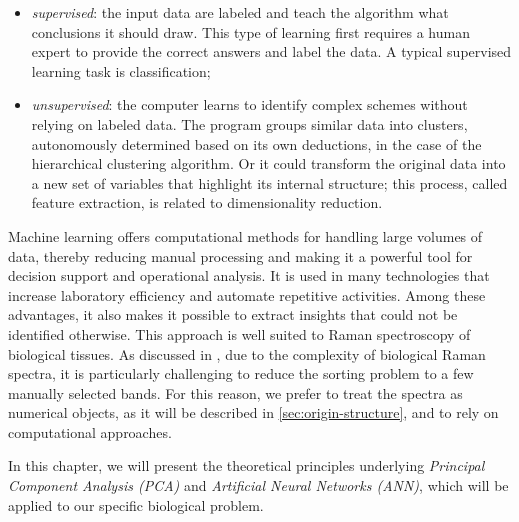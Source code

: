 \begin{itemize}
    \item \textit{supervised}: the input data are labeled and teach the algorithm what conclusions it should draw. This type of learning first requires a human expert to provide the correct answers and label the data. 
A typical supervised learning task is classification;    

       \item \textit{unsupervised}: the computer learns to identify complex schemes without relying on labeled data. The program groups similar data into clusters, autonomously determined based on its own deductions, in the case of the hierarchical clustering algorithm. Or it could transform the original data into a new set of variables that highlight its internal structure; this process, called feature extraction, is related to dimensionality reduction.
       
\end{itemize}


Machine learning offers computational methods for handling large volumes of data, thereby reducing manual processing and making it a powerful tool for decision support and operational analysis. It is used in many technologies that increase laboratory efficiency and automate repetitive activities. Among these advantages, it also makes it possible to extract insights that could not be identified otherwise.
This approach is well suited to Raman spectroscopy of biological tissues. As discussed in , due to the complexity of biological Raman spectra, it is particularly challenging to reduce the sorting problem to a few manually selected bands. For this reason, we prefer to treat the spectra as numerical objects, as it will be described in \cref{sec:origin-structure}, and to rely on computational approaches.

In this chapter, we will present the theoretical principles underlying \textit{Principal Component Analysis (PCA)} and \textit{Artificial Neural Networks (ANN)}, which will be applied to our specific biological problem.



